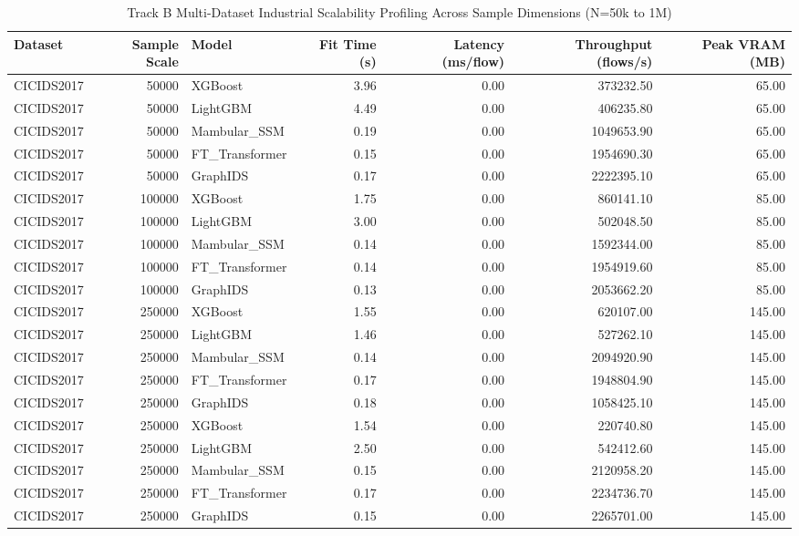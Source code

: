 \begin{table}[t]
\centering
\caption{Track B Multi-Dataset Industrial Scalability Profiling Across Sample Dimensions (N=50k to 1M)}
\label{tab:multi_dataset_scalability_results}
\small
\begin{tabular}{lrlrrrr}
\toprule
Dataset & Sample Scale & Model & Fit Time (s) & Latency (ms/flow) & Throughput (flows/s) & Peak VRAM (MB) \\
\midrule
CICIDS2017 & 50000 & XGBoost & 3.96 & 0.00 & 373232.50 & 65.00 \\
CICIDS2017 & 50000 & LightGBM & 4.49 & 0.00 & 406235.80 & 65.00 \\
CICIDS2017 & 50000 & Mambular_SSM & 0.19 & 0.00 & 1049653.90 & 65.00 \\
CICIDS2017 & 50000 & FT_Transformer & 0.15 & 0.00 & 1954690.30 & 65.00 \\
CICIDS2017 & 50000 & GraphIDS & 0.17 & 0.00 & 2222395.10 & 65.00 \\
CICIDS2017 & 100000 & XGBoost & 1.75 & 0.00 & 860141.10 & 85.00 \\
CICIDS2017 & 100000 & LightGBM & 3.00 & 0.00 & 502048.50 & 85.00 \\
CICIDS2017 & 100000 & Mambular_SSM & 0.14 & 0.00 & 1592344.00 & 85.00 \\
CICIDS2017 & 100000 & FT_Transformer & 0.14 & 0.00 & 1954919.60 & 85.00 \\
CICIDS2017 & 100000 & GraphIDS & 0.13 & 0.00 & 2053662.20 & 85.00 \\
CICIDS2017 & 250000 & XGBoost & 1.55 & 0.00 & 620107.00 & 145.00 \\
CICIDS2017 & 250000 & LightGBM & 1.46 & 0.00 & 527262.10 & 145.00 \\
CICIDS2017 & 250000 & Mambular_SSM & 0.14 & 0.00 & 2094920.90 & 145.00 \\
CICIDS2017 & 250000 & FT_Transformer & 0.17 & 0.00 & 1948804.90 & 145.00 \\
CICIDS2017 & 250000 & GraphIDS & 0.18 & 0.00 & 1058425.10 & 145.00 \\
CICIDS2017 & 250000 & XGBoost & 1.54 & 0.00 & 220740.80 & 145.00 \\
CICIDS2017 & 250000 & LightGBM & 2.50 & 0.00 & 542412.60 & 145.00 \\
CICIDS2017 & 250000 & Mambular_SSM & 0.15 & 0.00 & 2120958.20 & 145.00 \\
CICIDS2017 & 250000 & FT_Transformer & 0.17 & 0.00 & 2234736.70 & 145.00 \\
CICIDS2017 & 250000 & GraphIDS & 0.15 & 0.00 & 2265701.00 & 145.00 \\

\end{tabular}
\end{table}
